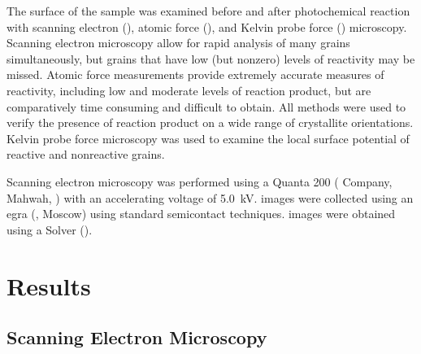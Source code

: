The surface of the sample was examined before and after photochemical reaction with
scanning electron (), atomic force (), and Kelvin probe force
() microscopy. Scanning electron microscopy allow for rapid analysis of many
grains simultaneously, but grains that have low (but nonzero) levels of reactivity may be
missed. Atomic force measurements provide extremely accurate measures of reactivity,
including low and moderate levels of reaction product, but are comparatively time
consuming and difficult to obtain. All methods were used to verify the presence of
reaction product on a wide range of crystallite orientations. Kelvin probe force
microscopy was used to examine the local surface potential of reactive and nonreactive
grains.

Scanning electron microscopy was performed using a Quanta 200  
( Company, Mahwah,
) with an accelerating voltage of \SI{5.0}{\kilo\volt}.  images were
collected using an egra  (, Moscow) using standard
semicontact techniques.  images were obtained using a Solver
 ().


\section{Results}
\label{sec:ch9results}


\subsection{Scanning Electron Microscopy}
\label{subsec:ch9sem}



